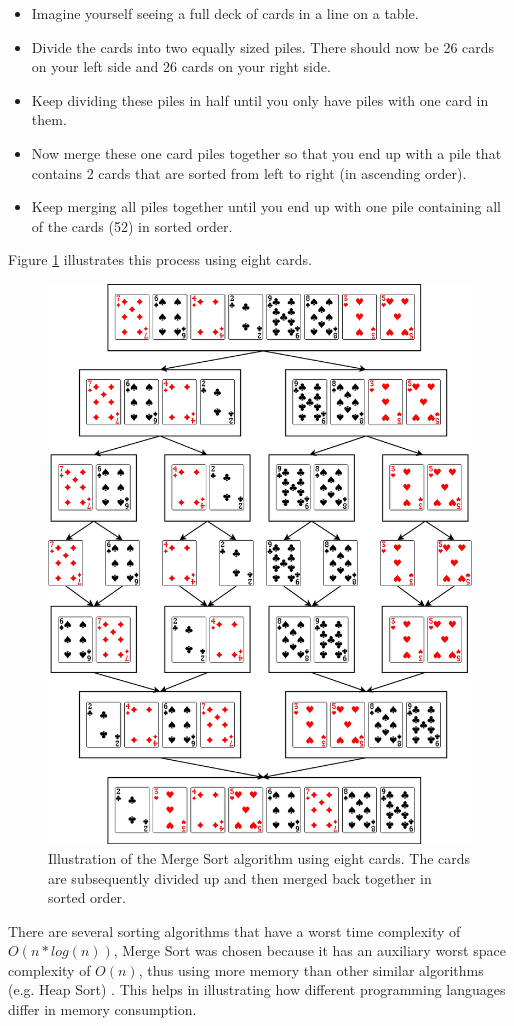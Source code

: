 \begin{itemize}
\item Imagine yourself seeing a full deck of cards in a line on a table.
\item Divide the cards into two equally sized piles. There should now be 26 cards on your left side and 26 cards on your right side.
\item Keep dividing these piles in half until you only have piles with one card in them. 
\item Now merge these one card piles together so that you end up with a pile that contains 2 cards that are sorted from left to right (in ascending order).
\item Keep merging all piles together until you end up with one pile containing all of the cards (52) in sorted order.

\end{itemize} 

Figure \ref{fig:mergesort} illustrates this process using eight cards.

\begin{figure}[h]
	\centering
	\includegraphics[width=0.9\linewidth]{chapters/media/mergesort4.png}
	\caption{Illustration of the Merge Sort algorithm using eight cards. The cards are subsequently divided up and then merged back together in sorted order.}
	\label{fig:mergesort}
\end{figure}

There are several sorting algorithms that have a worst time complexity of $O(n * log(n))$, Merge Sort was chosen because it has an auxiliary worst space complexity of $O(n)$, thus using more memory than other similar algorithms (e.g. Heap Sort) \cite{Mergesort}. This helps in illustrating how different programming languages differ in memory consumption.





